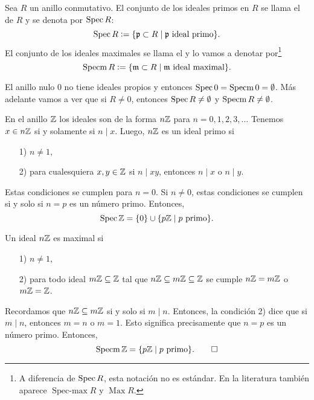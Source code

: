 \begin{notacion}
  Sea $R$ un anillo conmutativo. El conjunto de los ideales primos en $R$
  se llama el  de $R$
  y se denota por $\operatorname{Spec} R$:
  \[ \operatorname{Spec} R \mathrel{\mathop:}= \{ \mathfrak{p} \subset R \mid
                     \mathfrak{p}\text{ ideal primo} \}. \]
  El conjunto de los ideales maximales se llama el  y lo vamos a denotar por\footnote{A
    diferencia de $\operatorname{Spec} R$, esta notación no es estándar. En la literatura
    también aparece $\operatorname{Spec-max} R$ y $\operatorname{Max} R$.}
  \[ \operatorname{Specm} R \mathrel{\mathop:}= \{ \mathfrak{m} \subset R \mid
                     \mathfrak{m}\text{ ideal maximal} \}. \]
\end{notacion}

\begin{ejemplo}
  El anillo nulo $0$ no tiene ideales propios y entonces
  $\operatorname{Spec} 0 = \operatorname{Specm} 0 = \emptyset$. Más adelante vamos a ver que si $R \ne 0$,
  entonces $\operatorname{Spec} R \ne \emptyset$ y $\operatorname{Specm} R \ne \emptyset$.
\end{ejemplo}

\begin{ejemplo}
  En el anillo $\mathbb{Z}$ los ideales son de la forma $n\mathbb{Z}$ para
  $n = 0,1,2,3,\ldots$ Tenemos $x \in n\mathbb{Z}$ si y solamente si $n \mid x$.
  Luego, $n\mathbb{Z}$ es un ideal primo si
  \begin{enumerate}
  \item[1)] $n \ne 1$,
  \item[2)] para cualesquiera $x,y\in\mathbb{Z}$ si $n \mid xy$, entonces $n \mid x$ o
    $n \mid y$.
  \end{enumerate}

  Estas condiciones se cumplen para $n = 0$. Si $n \ne 0$, estas condiciones se
  cumplen si y solo si $n = p$ es un número primo. Entonces,
  $$\operatorname{Spec} \mathbb{Z} = \{ 0 \} \cup \{ p\mathbb{Z} \mid p\text{ primo} \}.$$

  Un ideal $n\mathbb{Z}$ es maximal si
  \begin{enumerate}
  \item[1)] $n \ne 1$,
  \item[2)] para todo ideal $m\mathbb{Z} \subseteq \mathbb{Z}$ tal que
    $n\mathbb{Z} \subseteq m\mathbb{Z} \subseteq \mathbb{Z}$ se cumple $n\mathbb{Z} = m\mathbb{Z}$ o $m\mathbb{Z} = \mathbb{Z}$.
  \end{enumerate}

  Recordamos que $n\mathbb{Z} \subseteq m\mathbb{Z}$ si y solo si $m\mid n$. Entonces,
  la condición 2) dice que si $m\mid n$, entonces $m = n$ o $m = 1$.
  Esto significa precisamente que $n = p$ es un número primo. Entonces,
  \[ \operatorname{Specm} \mathbb{Z} = \{ p\mathbb{Z} \mid p\text{ primo} \}. \qedhere \]
\end{ejemplo}

